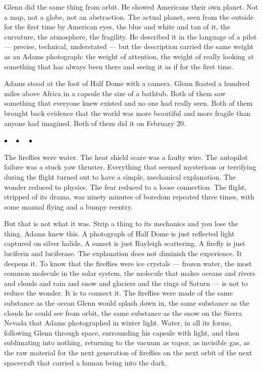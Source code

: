 \documentclass[12pt, letterpaper]{article}
\begin{document}
Glenn did the same thing from orbit. He showed Americans their own planet. Not a map, not a globe, not an abstraction. The actual planet, seen from the outside for the first time by American eyes, the blue and white and tan of it, the curvature, the atmosphere, the fragility. He described it in the language of a pilot --- precise, technical, understated --- but the description carried the same weight as an Adams photograph: the weight of attention, the weight of really looking at something that has always been there and seeing it as if for the first time.

Adams stood at the foot of Half Dome with a camera. Glenn floated a hundred miles above Africa in a capsule the size of a bathtub. Both of them saw something that everyone knew existed and no one had really seen. Both of them brought back evidence that the world was more beautiful and more fragile than anyone had imagined. Both of them did it on February 20.

\begin{center}
$\bullet\quad\bullet\quad\bullet$
\end{center}

The fireflies were water. The heat shield scare was a faulty wire. The autopilot failure was a stuck yaw thruster. Everything that seemed mysterious or terrifying during the flight turned out to have a simple, mechanical explanation. The wonder reduced to physics. The fear reduced to a loose connection. The flight, stripped of its drama, was ninety minutes of boredom repeated three times, with some manual flying and a bumpy reentry.

But that is not what it was. Strip a thing to its mechanics and you lose the thing. Adams knew this. A photograph of Half Dome is just reflected light captured on silver halide. A sunset is just Rayleigh scattering. A firefly is just luciferin and luciferase. The explanation does not diminish the experience. It deepens it. To know that the fireflies were ice crystals --- frozen water, the most common molecule in the solar system, the molecule that makes oceans and rivers and clouds and rain and snow and glaciers and the rings of Saturn --- is not to reduce the wonder. It is to connect it. The fireflies were made of the same substance as the ocean Glenn would splash down in, the same substance as the clouds he could see from orbit, the same substance as the snow on the Sierra Nevada that Adams photographed in winter light. Water, in all its forms, following Glenn through space, surrounding his capsule with light, and then sublimating into nothing, returning to the vacuum as vapor, as invisible gas, as the raw material for the next generation of fireflies on the next orbit of the next spacecraft that carried a human being into the dark.
\end{document}
